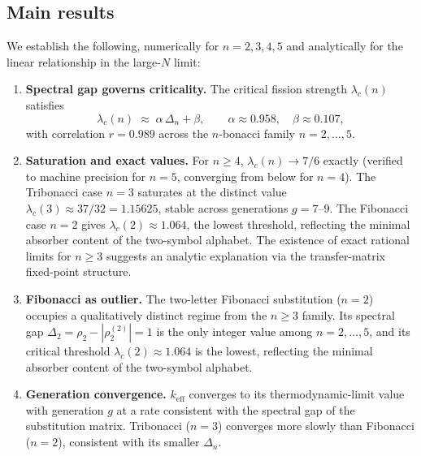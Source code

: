 \documentclass[11pt]{article}
\newcommand{\keff}{k_{\mathrm{eff}}}
\newcommand{\lc}{\lambda_c}
\begin{document}
\subsection{Main results}

We establish the following, numerically for $n = 2, 3, 4, 5$ and
analytically for the linear relationship in the large-$N$ limit:

\begin{enumerate}
  \item \textbf{Spectral gap governs criticality.}
    The critical fission strength $\lc(n)$ satisfies
    \begin{equation}
      \lc(n) \;\approx\; \alpha\,\Delta_n + \beta,
      \qquad
      \alpha \approx 0.958,\quad \beta \approx 0.107,
      \label{eq:linear-fit}
    \end{equation}
    with correlation $r = 0.989$ across the $n$-bonacci family $n=2,\ldots,5$.

  \item \textbf{Saturation and exact values.}
    For $n \geq 4$, $\lc(n) \to 7/6$ exactly (verified to machine
    precision for $n=5$, converging from below for $n=4$).
    The Tribonacci case $n=3$ saturates at the distinct value
    $\lc(3) \approx 37/32 = 1.15625$, stable across generations $g = 7$--$9$.
    The Fibonacci case $n=2$ gives $\lc(2) \approx 1.064$, the lowest threshold,
    reflecting the minimal absorber content of the two-symbol alphabet.
    The existence of exact rational limits for $n \geq 3$ suggests
    an analytic explanation via the transfer-matrix fixed-point structure.

  \item \textbf{Fibonacci as outlier.}
    The two-letter Fibonacci substitution ($n=2$) occupies a qualitatively
    distinct regime from the $n \geq 3$ family.
    Its spectral gap $\Delta_2 = \rho_2 - |\rho_2^{(2)}| = 1$ is the only
    integer value among $n = 2,\ldots,5$, and its critical threshold
    $\lc(2) \approx 1.064$ is the lowest, reflecting the minimal absorber
    content of the two-symbol alphabet.

  \item \textbf{Generation convergence.}
    $\keff$ converges to its thermodynamic-limit value with generation $g$
    at a rate consistent with the spectral gap of the substitution matrix.
    Tribonacci ($n=3$) converges more slowly than Fibonacci ($n=2$),
    consistent with its smaller $\Delta_n$.
\end{enumerate}
\end{document}
